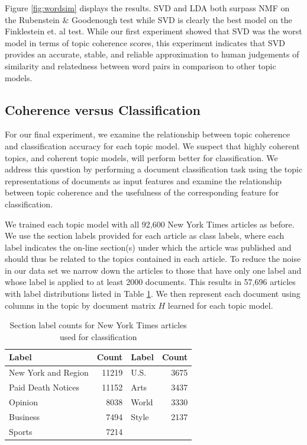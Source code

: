 Figure \ref{fig:wordsim} displays the results.  SVD and LDA both surpass NMF on
the Rubenstein \& Goodenough test while SVD is clearly the best model on the
Finklestein et. al test.  While our first experiment showed that SVD was the
worst model in terms of topic coherence scores, this experiment indicates that
SVD provides an accurate, stable, and reliable approximation to human judgements
of similarity and relatedness between word pairs in comparison to other topic
models.

\subsection{Coherence versus Classification}

For our final experiment, we examine the relationship between topic
coherence and classification accuracy for each topic model.  We suspect that
highly coherent topics, and coherent topic models, will perform better for
classification.  We address this question by performing a document
classification task using the topic representations of documents as input features
and examine the relationship between topic coherence and the usefulness of the
corresponding feature for classification.

We trained each topic model with all 92,600 New York Times articles as before.
We use the section labels provided for each article as class labels, where each
label indicates the on-line section(s) under which the article was published and
should thus be related to the topics contained in each article.  To reduce the
noise in our data set we narrow down the articles to those that have only one
label and whose label is applied to at least 2000 documents.   This results in
57,696 articles with label distributions listed in Table \ref{tab:labels}.  We
then represent each document using columns in the topic by document matrix $H$
learned for each topic model.

\begin{table}[htbp]
  \centering
  \begin{tabular}{lr|lr}
    Label & Count & Label & Count \\ \hline
    New York and Region & 11219 &  U.S. & 3675	\\   
    Paid Death Notices & 11152 &   Arts & 3437	\\   
    Opinion & 8038 &               World & 3330	\\   
    Business & 7494 &              Style & 2137	\\   
    Sports & 7214 
  \end{tabular}
  \caption{Section label counts for New York Times articles used for
  classification}
  \label{tab:labels}
\end{table}

